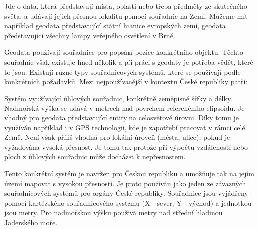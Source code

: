 



Jde o data, která představují místa, oblasti nebo třeba předměty ze skutečného světa, a udávají jejich přesnou lokalitu pomocí souřadnic na Zemi. Můžeme mít například geodata představující státní hranice evropských zemí, geodata představující všechny lampy veřejného osvětlení v Brně.


Geodata používají souřadnice pro popsání pozice konkrétního objektu. Těchto souřadnic však existuje hned několik a při práci s geodaty je potřeba vědět, které to jsou. Existují různé typy souřadnicových systémů, které se používají podle konkrétních požadavků. Mezi nejpoužívanější v kontextu České republiky patří:



Systém využívající úhlových souřadnic, konkrétně zeměpisné šířky a délky. Nadmořská výška se udává v metrech nad povrchem referenčního elipsoidu.
Je vhodný pro geodata představující entity na celosvětové úrovni. Díky tomu je využíván například i v GPS technologii, kde je zapotřebí pracovat v rámci celé Země.
Není však příliš vhodná pro lokální úroveň (města, ulice), pokud je vyžadována vysoká přesnost. Je tomu tak protože při výpočtu vzdáleností nebo ploch z úhlových souřadnic může docházet k nepřesnostem.



Tento konkrétní systém je navržen pro Českou republiku a umožňuje tak na jejím území mapovat s vysokou přesností. Je proto používán jako jeden ze závazných souřadnicových systémů pro orgány České republiky.
Souřadnice jsou vyjádřeny pomocí kartézského souřadnicového systému (X - sever, Y - východ) a jednotkou jsou metry. Pro nadmořskou výšku používá metry nad střední hladinou Jaderského moře.

